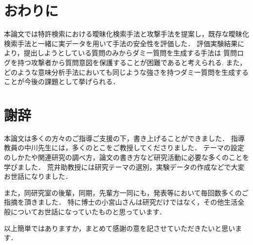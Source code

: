 \documentclass[master]{suribt}
\theoremstyle{definition}
\begin{document}
 \chapter{おわりに}
 本論文では特許検索における曖昧化検索手法と攻撃手法を提案し，既存な曖昧化検索手法と一緒に実データを用いて手法の安全性を評価した．
 評価実験結果により，提出しようとしている質問のみからダミー質問を生成する手法は
 質問ログを持つ攻撃者から質問意図を保護することが困難であると考えられる.
 また，どのような意味分析手法においても同じような強さを持つダミー質問を生成することが今後の課題として挙げられる．






 \backmatter%
 \chapter{謝辞}%
 本論文は多くの方々のご指導ご支援の下，書き上げることができました．
 指導教員の中川先生には，多くのとこをご教授してくださりました．
 テーマの設定のしかたや関連研究の調べ方，論文の書き方など研究活動に必要な多くのことを学びました．
 荒井助教授には研究テーマの選別，実験データの作成などで大変お世話になりました．
 
 また，同研究室の後輩，同期，先輩方一同にも，発表等において毎回数多くのご指摘を頂きました．
 特に博士の小宮山さんは研究だけではなく，その他生活全般についてお世話になっていたものと思っています．
 
 以上簡単ではありますか，まとめて感謝の意を記させていただきたいと思います．


  \appendix%

  
\end{document}
